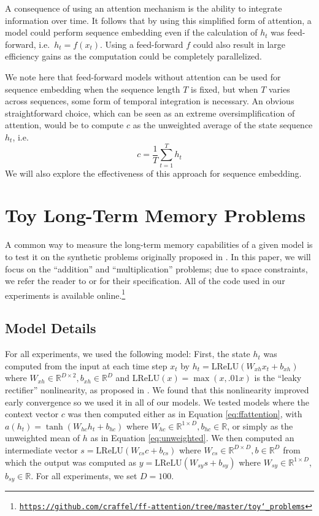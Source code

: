 \documentclass{article} %
\begin{document}
A consequence of using an attention mechanism is the ability to integrate information over time.
It follows that by using this simplified form of attention, a model could perform sequence embedding even if the calculation of $h_t$ was feed-forward, i.e.\ $h_t = f(x_t)$.
Using a feed-forward $f$ could also result in large efficiency gains as the computation could be completely parallelized.

We note here that feed-forward models without attention can be used for sequence embedding when the sequence length $T$ is fixed, but when $T$ varies across sequences, some form of temporal integration is necessary.
An obvious straightforward choice, which can be seen as an extreme oversimplification of attention, would be to compute $c$ as the unweighted average of the state sequence $h_t$, i.e.
\begin{equation}
\label{eq:unweighted}
c = \frac{1}{T}\sum_{t = 1}^T h_t
\end{equation}
We will also explore the effectiveness of this approach for sequence embedding.

\section{Toy Long-Term Memory Problems}

A common way to measure the long-term memory capabilities of a given model is to test it on the synthetic problems originally proposed in \cite{hochreiter1997long}.
In this paper, we will focus on the ``addition'' and ``multiplication'' problems; due to space constraints, we refer the reader to \cite{hochreiter1997long} or \cite{sutskever2013importance} for their specification.
All of the code used in our experiments is available online.\footnote{\href{https://github.com/craffel/ff-attention/tree/master/toy_problems}{\texttt{https://github.com/craffel/ff-attention/tree/master/toy\char`_problems}}}

\subsection{Model Details}

For all experiments, we used the following model:
First, the state $h_t$ was computed from the input at each time step $x_t$ by $h_t = \textrm{LReLU}(W_{xh}x_t + b_{xh})$ where $W_{xh} \in \mathbb{R}^{D \times 2}, b_{xh} \in \mathbb{R}^D$ and $\textrm{LReLU}(x) = \max(x, .01x)$ is the ``leaky rectifier'' nonlinearity, as proposed in \cite{maas2013rectifier}.
We found that this nonlinearity improved early convergence so we used it in all of our models.
We tested models where the context vector $c$ was then computed either as in Equation \ref{eq:ffattention}, with $a(h_t) =\tanh(W_{hc}h_t + b_{hc})$
where $W_{hc} \in \mathbb{R}^{1 \times D}, b_{hc} \in \mathbb{R}$, or simply as the unweighted mean of $h$ as in Equation \ref{eq:unweighted}.
We then computed an intermediate vector $s = \textrm{LReLU}(W_{cs}c + b_{cs})$ where $W_{cs} \in \mathbb{R}^{D \times D}, b \in \mathbb{R}^D$ from which the output was computed as $y = \textrm{LReLU}(W_{sy}s + b_{sy})$ where $W_{sy} \in \mathbb{R}^{1 \times D}$, $b_{sy} \in \mathbb{R}$.
For all experiments, we set $D = 100$.
\end{document}

